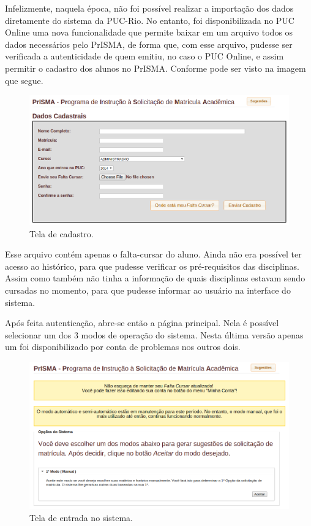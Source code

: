 \documentclass[graduacao,brazil]{ThesisPUC}
\begin{document}
Infelizmente, naquela época, não foi possível realizar a importação dos dados diretamente do sistema da PUC-Rio. No entanto, foi disponibilizada no PUC Online uma nova funcionalidade que permite baixar em um arquivo todos os dados necessários pelo PrISMA, de forma que, com esse arquivo, pudesse ser verificada a autenticidade de quem emitiu, no caso o PUC Online, e assim permitir o cadastro dos alunos no PrISMA. Conforme pode ser visto na imagem que segue.

\begin{figure}[H]
    \centering
    \includegraphics[width=\linewidth]{img/v2_cadastro.png}
    \caption{Tela de cadastro.}
\end{figure}

Esse arquivo contém apenas o falta-cursar do aluno. Ainda não era possível ter acesso ao histórico, para que pudesse verificar os pré-requisitos das disciplinas. Assim como também não tinha a informação de quais disciplinas estavam sendo cursadas no momento, para que pudesse informar ao usuário na interface do sistema.

Após feita autenticação, abre-se então a página principal. Nela é possível selecionar um dos 3 modos de operação do sistema. Nesta última versão apenas um foi disponibilizado por conta de problemas nos outros dois.

\begin{figure}[H]
    \centering
    \includegraphics[width=\linewidth]{img/v2_main.png}
    \caption{Tela de entrada no sistema.}
\end{figure}
\end{document}
